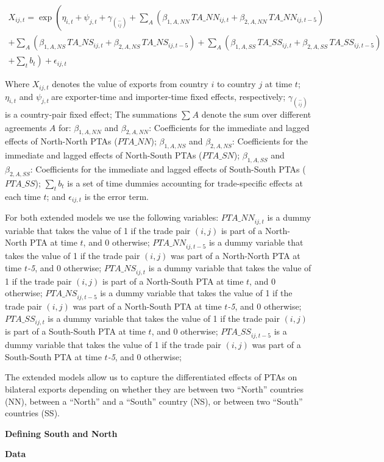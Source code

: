 \begin{multline}
    X_{ij,t} = \exp\left(\eta_{i,t} + \psi_{j,t} + \gamma_{\binom{-}{ij}} + \sum_{A}\left(\beta_{1,A,NN} \, TA\_NN_{ij,t} + \beta_{2,A,NN} \, TA\_NN_{ij,t-5}\right) \right. \\
    + \sum_{A}\left(\beta_{1,A,NS} \, TA\_NS_{ij,t} + \beta_{2,A,NS} \, TA\_NS_{ij,t-5}\right) + \sum_{A}\left(\beta_{1,A,SS} \, TA\_SS_{ij,t} + \beta_{2,A,SS} \, TA\_SS_{ij,t-5}\right) \\
    + \left. \sum_{t} b_{t} \right) + \epsilon_{ij,t}
\end{multline}

Where \(X_{ij,t}\)\hspace{0pt} denotes the value of exports from country
\(i\) to country \(j\) at time \(t\); \(\eta_{i,t}\) and
\(\psi_{j,t}\ \)are exporter-time and importer-time fixed effects,
respectively; \(\gamma_{\binom{-}{ij}}\) is a country-pair fixed effect;
The summations \hspace{0pt}\(\sum_{}^{}A\) denote the sum over different
agreements \(A\) for: \(\beta_{1,A,NN}\) and \(\beta_{2,A,NN}\):
Coefficients for the immediate and lagged effects of North-North PTAs
\hspace{0pt}(\(PTA\_ NN\)); \(\beta_{1,A,NS}\) and \(\beta_{2,A,NS}\):
Coefficients for the immediate and lagged effects of North-South PTAs
(\(PTA\_ SN\)); \(\beta_{1,A,SS}\) and \(\beta_{2,A,SS}\): Coefficients
for the immediate and lagged effects of South-South PTAs (\(PTA\_ SS\));
\(\sum_{t}^{}b_{t}\) is a set of time dummies accounting for
trade-specific effects at each time \(t\); and \(\epsilon_{ij,t}\) is
the error term.

For both extended models we use the following variables:
\({PTA\_ NN}_{ij,t}\) is a dummy variable that takes the value of 1 if
the trade pair \((i,j)\) is part of a North-North PTA at time \(t\), and
0 otherwise; \({PTA\_ NN}_{ij,t - 5}\) is a dummy variable that takes
the value of 1 if the trade pair \((i,j)\) was part of a North-North PTA
at time \(t\)\emph{-5}, and 0 otherwise; \({PTA\_ NS}_{ij,t}\) is a
dummy variable that takes the value of 1 if the trade pair \((i,j)\) is
part of a North-South PTA at time \(t\), and 0 otherwise;
\({PTA\_ NS}_{ij,t - 5}\) is a dummy variable that takes the value of 1
if the trade pair \((i,j)\) was part of a North-South PTA at time
\(t\)\emph{-5}, and 0 otherwise; \({PTA\_ SS}_{ij,t}\) is a dummy
variable that takes the value of 1 if the trade pair \((i,j)\) is part
of a South-South PTA at time \(t\), and 0 otherwise;
\({PTA\_ SS}_{ij,t - 5}\) is a dummy variable that takes the value of 1
if the trade pair \((i,j)\) was part of a South-South PTA at time
\(t\)\emph{-5}, and 0 otherwise;

The extended models allow us to capture the differentiated effects of
PTAs on bilateral exports depending on whether they are between two
``North'' countries (NN), between a ``North'' and a ``South'' country
(NS), or between two ``South'' countries (SS).

\textbf{Defining South and North}

\textbf{Data}